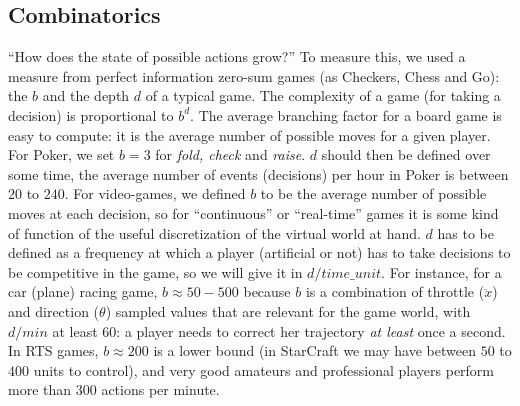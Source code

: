 \subsection{Combinatorics}
``How does the state of possible actions grow?'' To measure this, we used a measure from perfect information zero-sum games (as Checkers, Chess and Go): the  $b$ and the depth $d$ of a typical game. The complexity of a game (for taking a decision) is proportional to $b^d$. The average branching factor for a board game is easy to compute: it is the average number of possible moves for a given player. For Poker, we set $b=3$ for \textit{fold, check} and \textit{raise}. $d$ should then be defined over some time, the average number of events (decisions) per hour in Poker is between $20$ to $240$. For video-games, we defined $b$ to be the average number of possible moves at each decision, so for ``continuous'' or ``real-time'' games it is some kind of function of the useful discretization of the virtual world at hand. $d$ has to be defined as a frequency at which a player (artificial or not) has to take decisions to be competitive in the game, so we will give it in $d/time\_unit$. For instance, for a car (plane) racing game, $b \approx 50-500$ because $b$ is a combination of throttle ($\ddot{x}$) and direction ($\theta$) sampled values that are relevant for the game world, with $d/min$ at least $60$: a player needs to correct her trajectory \textit{at least} once a second. In RTS games, $b \approx 200$ is a lower bound (in StarCraft we may have between $50$ to $400$ units to control), and very good amateurs and professional players perform more than $300$ actions per minute.

